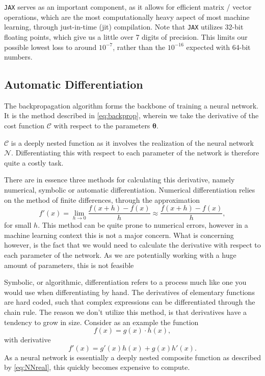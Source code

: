 \verb|JAX| serves as an important component, as it allows for efficient matrix / vector operations, which are the most computationally heavy aspect of most machine learning, through just-in-time (jit) compilation.
Note that \verb|JAX| utilizes 32-bit floating points, which give us a little over 7 digits of precision.
This limits our possible lowest loss to around $10^{-7}$, rather than the $10^{-16}$ expected with 64-bit numbers.

\subsection{Automatic Differentiation}\label{sec:autodiff}
The backpropagation algorithm \cite{Backpropogation1986} forms the backbone of training a neural network.
It is the method described in \eqref{eq:backprop}, wherein we take the derivative of the cost function $\mathcal{C}$ with respect to the parameters $\boldsymbol{\theta}$.

$\mathcal{C}$ is a deeply nested function as it involves the realization of the neural network $\mathcal{N}$.
Differentiating this with respect to each parameter of the network is therefore quite a costly task.

There are in essence three methods for calculating this derivative, namely numerical, symbolic or automatic differentiation.
Numerical differentiation relies on the method of finite differences, through the approximation
\begin{equation}
    f'(x) = \lim_{h \to 0} \frac{f(x+h) - f(x)}{h} \approx \frac{f(x + h) - f(x)}{h},
\end{equation}
for small $h$.
This method can be quite prone to numerical errors, however in a machine learning context this is not a major concern.
What is concerning however, is the fact that we would need to calculate the derivative with respect to each parameter of the network.
As we are potentially working with a huge amount of parameters, this is not feasible

Symbolic, or algorithmic, differentiation refers to a process much like one you would use when differentiating by hand.
The derivatives of elementary functions are hard coded, such that complex expressions can be differentiated through the chain rule.
The reason we don't utilize this method, is that derivatives have a tendency to grow in size.
Consider as an example the function
\begin{equation}
    f(x) = g(x) \cdot h(x),
\end{equation}
with derivative
\begin{equation}
    f'(x) = g'(x) h(x) + g(x) h'(x).
\end{equation}
As a neural network is essentially a deeply nested composite function as described by \eqref{eq:NNreal}, this quickly becomes expensive to compute.

